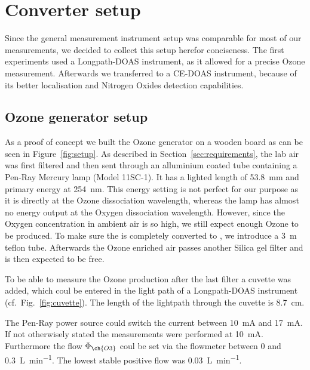 \section{Converter setup}
\label{sec:setup}

Since the general measurement instrument setup was comparable for most
of our measurements, we decided to collect this setup herefor
conciseness. The first experiments used a Longpath-DOAS instrument, as
it allowed for a precise Ozone measurement. Afterwards we transferred
to a CE-DOAS instrument, because of its better localisation and
Nitrogen Oxides detection capabilities.

\subsection{Ozone generator setup}
\label{sec:ozone-setup}

As a proof of concept we built the Ozone generator on a wooden board
as can be seen in Figure~\ref{fig:setup}. As described in
Section~\ref{sec:requirements}, the lab air was first filtered and
then sent through an alluminium coated tube containing a Pen-Ray
Mercury lamp (Model 11SC-1). It has a lighted length of
\SI{53.8}{\milli\meter} and primary energy at
\SI{254}{\nano\meter}. This energy setting is not perfect for
our purpose as it is directly at the Ozone dissociation wavelength,
whereas the lamp has almost no energy output at the Oxygen
dissociation wavelength. However, since the Oxygen concentration in
ambient air is so high, we still expect enough Ozone to be
produced. 
To make sure the  is completely converted to
, we introduce a \SI{3}{\meter} teflon tube. Afterwards the
Ozone enriched air passes another Silica gel filter and is then
expected to be  free.

To be able to measure the Ozone production after the last filter a
cuvette was added, which coul be entered in the light path of a
Longpath-DOAS instrument (cf.\ Fig.~\ref{fig:cuvette}). The length of
the lightpath through the cuvette is \SI{8.7}{\centi\meter}. 

The Pen-Ray power source could switch the current between
\SI{10}{\milli\ampere} and \SI{17}{\milli\ampere}. If not otherwisely
stated the measurements were performed at \SI{10}{\milli\ampere}.
Furthermore the flow $\Phi_{\ch{O 3}}$ coul be set via the flowmeter
between \num{0} and \SI{0.3}{\liter\per\minute}. The lowest stable
positive flow was \SI{0.03}{\liter\per\minute}.

